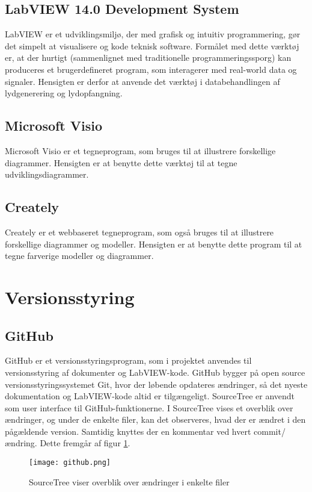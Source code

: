 	\subsection{LabVIEW 14.0 Development System}
	\label{subsec:labview}
	LabVIEW er et udviklingsmiljø, der med grafisk og intuitiv programmering, gør det simpelt at visualisere og kode teknisk software. Formålet med dette værktøj er, at der hurtigt (sammenlignet med traditionelle programmeringssporg) kan produceres et brugerdefineret program, som interagerer med real-world data og signaler. Hensigten er derfor at anvende det værktøj i databehandlingen af lydgenerering og lydopfangning. 
	
	\subsection{Microsoft Visio}   
	Microsoft Visio er et tegneprogram, som bruges til at illustrere forskellige diagrammer. Hensigten er at benytte dette værktøj til at tegne udviklingsdiagrammer.
	
	\subsection{Creately}
	Creately er et webbaseret tegneprogram, som også bruges til at illustrere forskellige diagrammer og modeller. Hensigten er at benytte dette program til at tegne farverige modeller og diagrammer. 
	
\section{Versionsstyring}
\subsection{GitHub}
GitHub er et versionsstyringsprogram, som i projektet anvendes til versionsstyring af dokumenter og LabVIEW-kode. GitHub
bygger på open source versionsstyringssystemet Git, hvor der løbende opdateres ændringer, så det nyeste dokumentation og LabVIEW-kode altid er tilgængeligt. SourceTree er anvendt som user interface til GitHub-funktionerne. I SourceTree vises et overblik over ændringer, og under de enkelte filer, kan det observeres, hvad der er ændret i den pågældende version. Samtidig knyttes der en kommentar ved hvert commit/ ændring. Dette fremgår af figur \ref{fig:git}. 

\begin{figure}[htb]
\centering
\texttt{[image: github.png]}
\caption{SourceTree viser overblik over ændringer i enkelte filer}
\label{fig:git}	
\end{figure}

